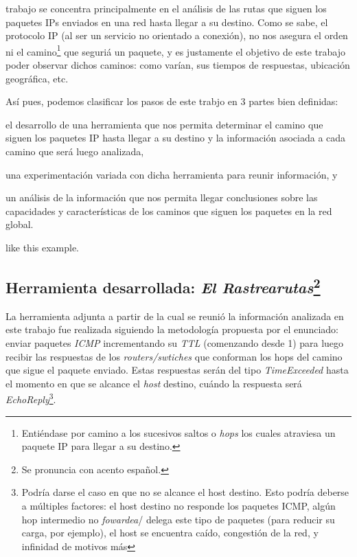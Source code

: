 trabajo se concentra principalmente en el an\'alisis
de las rutas que siguen los paquetes IPs enviados en una red hasta llegar a
su destino. Como se sabe, el protocolo IP (al ser un servicio no orientado
a conexi\'on), no nos asegura el orden ni el camino\footnote{Enti\'endase
por camino a los sucesivos saltos o \textit{hops}\cite{hop} los cuales
atraviesa un paquete IP para llegar a su destino.} que seguri\'a un paquete,
y es justamente el objetivo de este trabajo poder observar dichos caminos:
como var\'ian, sus tiempos de respuestas, ubicaci\'on geogr\'afica, etc.

\par As\'i pues, podemos clasificar los pasos de este trabjo en 3 partes
bien definidas:
\begin{enumerate*}[label=\itshape\alph*\upshape)]
    \item el desarrollo de una herramienta que nos permita determinar el
        camino que siguen los paquetes IP hasta llegar a su destino y la
        informaci\'on asociada a cada camino que ser\'a luego analizada, 

    \item una experimentaci\'on variada con dicha herramienta para reunir
        informaci\'on, y

    \item un an\'alisis de la informaci\'on que nos permita llegar conclusiones
        sobre las capacidades y caracter\'isticas de los caminos que siguen
        los paquetes en la red global.
\end{enumerate*} like this example.


\subsection*{Herramienta desarrollada: \textit{El Rastrearutas}\footnote{Se
pronuncia con acento espa\~nol.}}\label{sec:traceroute}
\par La herramienta adjunta a partir de la cual se reuni\'o la informaci\'on
analizada en este trabajo fue realizada siguiendo la metodolog\'ia propuesta
por el enunciado: enviar paquetes \textit{ICMP}\cite{rfc792} incrementando
su \textit{TTL} (comenzando desde 1) para luego recibir las respuestas de los
\textit{routers/swtiches} que conforman los hops del camino que sigue el paquete
enviado. Estas respuestas ser\'an del tipo \textit{TimeExceeded} hasta el
momento en que se alcance el \textit{host} destino, cu\'ando la respuesta ser\'a
\textit{EchoReply}\footnote{Podr\'ia darse el caso en que no se alcance el
host destino. Esto podr\'ia deberse a m\'ultiples factores: el host destino
no responde los paquetes ICMP, alg\'un hop intermedio no \textit{fowardea}/%
delega este tipo de paquetes (para reducir su carga, por ejemplo), el host
se encuentra ca\'ido, congesti\'on de la red, y infinidad de motivos m\'as}.

